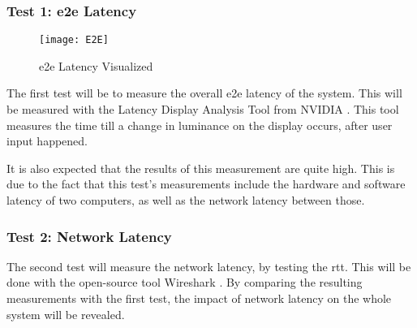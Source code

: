 \subsubsection{Test 1: \acrfull{e2e} Latency}
\begin{figure}[h!]
\caption{\acrfull{e2e} Latency Visualized \parencite{e2e}}
\label{fig:e2e}
\texttt{[image: E2E]}
\end{figure}
The first test will be to measure the overall \acrshort{e2e} latency of the system. This will be measured with the Latency Display Analysis Tool from NVIDIA \parencite{ldat}. This tool measures the time till a change in luminance on the display occurs, after user input happened.

It is also expected that the results of this measurement are quite high. This is due to the fact that this test's measurements include the hardware and software latency of two computers, as well as the network latency between those.

\subsubsection{Test 2: Network Latency}
The second test will measure the network latency, by testing the \acrfull{rtt}. This will be done with the open-source tool Wireshark \parencite{wireshark}. By comparing the resulting measurements with the first test, the impact of network latency on the whole system will be revealed.